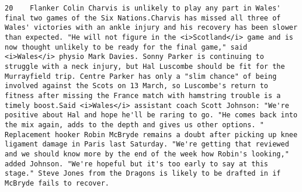 \documentclass[11pt]{article}
\begin{document}
\begin{Verbatim}[commandchars=\\\{\}]
         20    Flanker Colin Charvis is unlikely to play any part in Wales' final two games of the Six Nations.Charvis has missed all three of Wales' victories with an ankle injury and his recovery has been slower than expected. "He will not figure in the <i>Scotland</i> game and is now thought unlikely to be ready for the final game," said <i>Wales</i> physio Mark Davies. Sonny Parker is continuing to struggle with a neck injury, but Hal Luscombe should be fit for the Murrayfield trip. Centre Parker has only a "slim chance" of being involved against the Scots on 13 March, so Luscombe's return to fitness after missing the France match with hamstring trouble is a timely boost.Said <i>Wales</i> assistant coach Scott Johnson: "We're positive about Hal and hope he'll be raring to go. "He comes back into the mix again, adds to the depth and gives us other options. " Replacement hooker Robin McBryde remains a doubt after picking up knee ligament damage in Paris last Saturday. "We're getting that reviewed and we should know more by the end of the week how Robin's looking," added Johnson. "We're hopeful but it's too early to say at this stage." Steve Jones from the Dragons is likely to be drafted in if McBryde fails to recover.                                                                                                                                                                                                                                                                                                                                                                                                                                                                                                                                                                                                                                                                                                                                                                                                                                                                                                                                                                                                                                                                                                                                                                                                                                                                                                                                                                                                                                                                                                                                                                                                                                                                                                                                                                                                                                                                                                                                                                                                                                                                                                                                           
\end{Verbatim}
\end{document}
